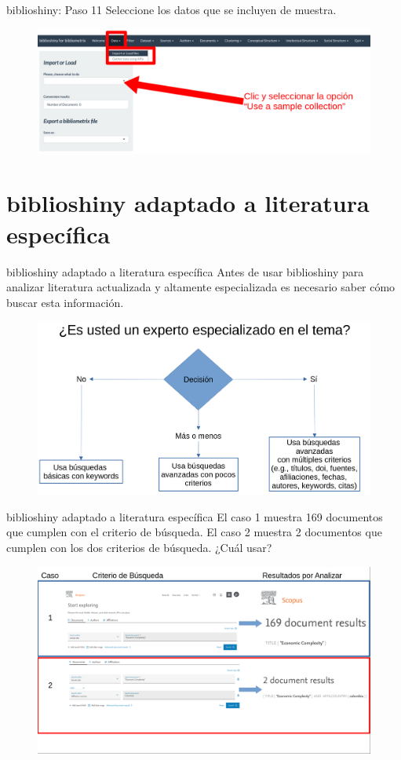 \documentclass{beamer}
\begin{document}
\begin{frame}{biblioshiny: Paso 11}
Seleccione los datos que se incluyen de muestra.
\begin{figure}
\centering
\includegraphics[width=.85\textwidth]{Paso10.png}
\end{figure}  
\end{frame}

\section{biblioshiny adaptado a literatura específica}

\begin{frame}{biblioshiny adaptado a literatura específica}
Antes de usar biblioshiny para analizar literatura actualizada y altamente especializada es necesario saber cómo buscar esta información.
\begin{figure}
\centering
\includegraphics[width=.85\textwidth]{experticia.png}
\end{figure}  
\end{frame}

\begin{frame}{biblioshiny adaptado a literatura específica}
El caso 1 muestra 169 documentos que cumplen con el criterio de búsqueda. El caso 2 muestra 2 documentos que cumplen con los dos criterios de búsqueda. ¿Cuál usar?
\begin{figure}
\centering
\includegraphics[width=.85\textwidth]{Casos12.png}
\end{figure}  
\end{frame}
\end{document}
